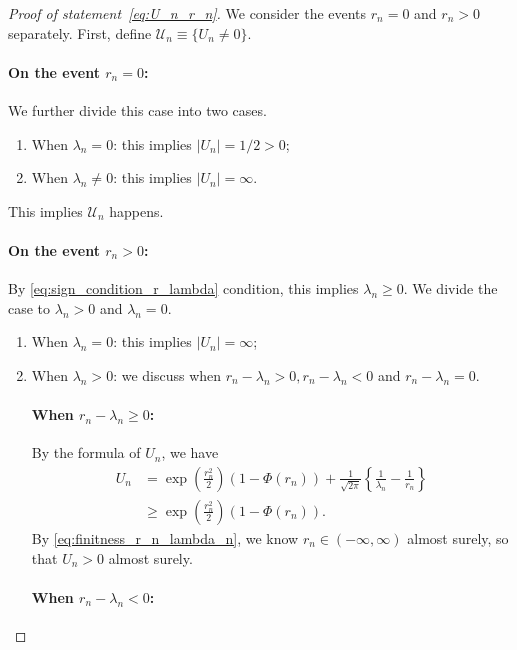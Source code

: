 \documentclass[12pt]{article}
\theoremstyle{definition}
\begin{document}
\begin{proof}[Proof of statement~\eqref{eq:U_n_r_n}]
	We consider the events $r_n = 0$ and $r_n > 0$ separately. First, define $\mathcal{U}_n\equiv \{U_n \neq 0\}$.

	\paragraph{On the event $r_n=0$:}

	We further divide this case into two cases.
	\begin{enumerate}
		\item When $\lambda_n=0$: this implies $|U_n|=1/2>0$;
		\item When $\lambda_n\neq 0$: this implies $|U_n|=\infty$.
	\end{enumerate}
	This implies $\mathcal{U}_n$ happens.

	\paragraph{On the event $r_n>0$:}
	
	By \eqref{eq:sign_condition_r_lambda} condition, this implies $\lambda_n\geq 0$. We divide the case to $\lambda_n>0$ and $\lambda_n=0$.
	\begin{enumerate}
		\item When $\lambda_n=0$: this implies $|U_n|=\infty$;
		\item When $\lambda_n>0$: we discuss when $r_n-\lambda_n>0,r_n-\lambda_n<0$ and $r_n-\lambda_n=0$. 

		\paragraph{When $r_n- \lambda_n\geq 0$:}
		By the formula of $U_n$, we have 
		\begin{align*}
			U_n
			&
			=\exp\left(\frac{r_n^2}{2}\right)(1-\Phi(r_n))+
			\frac{1}{\sqrt{2\pi}}\left\{\frac{1}{\lambda_n}-\frac{1}{r_n}\right\}\\
			&
			\geq \exp\left(\frac{r_n^2}{2}\right)(1-\Phi(r_n)).
		\end{align*}
		By \eqref{eq:finitness_r_n_lambda_n}, we know $r_n\in (-\infty,\infty)$ almost surely, so that $U_n>0$ almost surely.
		
		\paragraph{When $r_n-\lambda_n<0$:}


\end{enumerate}
\end{proof}
\end{document}

